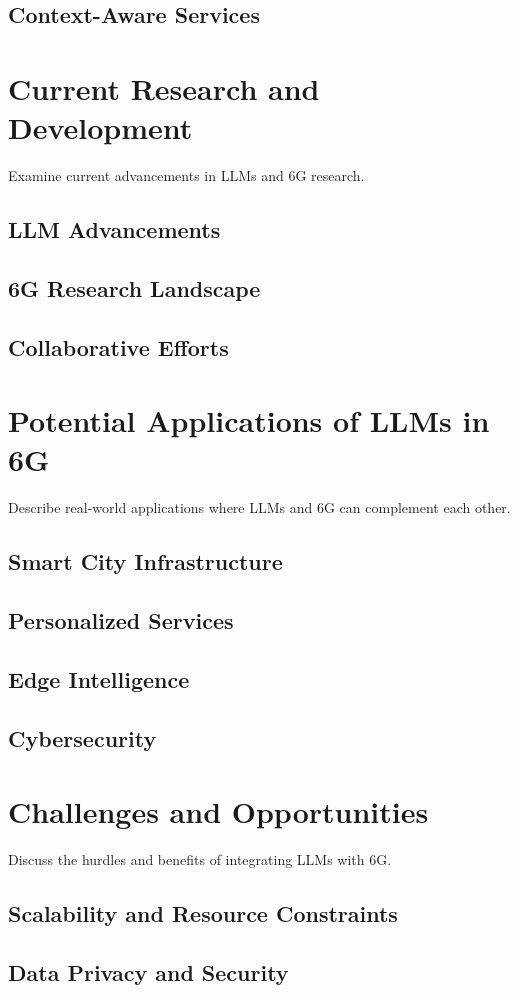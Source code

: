 \documentclass[12pt]{article}
\begin{document}
	\subsection{Context-Aware Services}
\newpage
\section{Current Research and Development}
Examine current advancements in LLMs and 6G research.
	\subsection{LLM Advancements}
	\subsection{6G Research Landscape}
	\subsection{Collaborative Efforts}
\newpage	
\section{Potential Applications of LLMs in 6G}
Describe real-world applications where LLMs and 6G can complement each other.
	\subsection{Smart City Infrastructure}
	\subsection{Personalized Services}
	\subsection{Edge Intelligence}
	\subsection{Cybersecurity}
\newpage
\section{Challenges and Opportunities}
Discuss the hurdles and benefits of integrating LLMs with 6G.
	\subsection{Scalability and Resource Constraints}
	\subsection{Data Privacy and Security}
\end{document}
